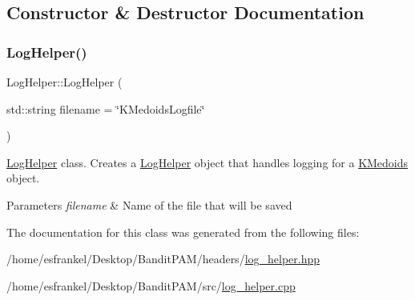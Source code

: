\subsection{Constructor \& Destructor Documentation}
\mbox{\label{classLogHelper_a4dd60abb04cadac82bd4b34edc931560}} 
\subsubsection{\texorpdfstring{Log\+Helper()}{LogHelper()}}
{\footnotesize\ttfamily Log\+Helper\+::\+Log\+Helper (\begin{DoxyParamCaption}\item[{std\+::string}]{filename = {\ttfamily \char`\"{}KMedoidsLogfile\char`\"{}} }\end{DoxyParamCaption})}

\hyperlink{classLogHelper}{Log\+Helper} class. Creates a \hyperlink{classLogHelper}{Log\+Helper} object that handles logging for a \hyperlink{classKMedoids}{K\+Medoids} object.


\begin{DoxyParams}{Parameters}
{\em filename} & Name of the file that will be saved \\
\hline
\end{DoxyParams}


The documentation for this class was generated from the following files\+:\begin{DoxyCompactItemize}
\item 
/home/esfrankel/\+Desktop/\+Bandit\+P\+A\+M/headers/\hyperlink{log__helper_8hpp}{log\+\_\+helper.\+hpp}\item 
/home/esfrankel/\+Desktop/\+Bandit\+P\+A\+M/src/\hyperlink{log__helper_8cpp}{log\+\_\+helper.\+cpp}\end{DoxyCompactItemize}
